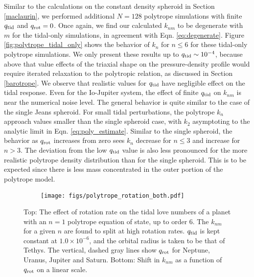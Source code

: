 Similar to the calculations on the constant density spheroid in Section \ref{maclaurin}, we
performed additional $N=128$ polytrope simulations with finite $q_{\rm tid}$ and
$q_{\rm rot}=0$. Once again, we find our calculated $k_{nm}$ to be degenerate with
$m$ for the tidal-only simulations, in agreement with Eqn. \eqref{eq:degenerate}.
Figure \ref{fig:polytrope_tidal_only} shows the behavior of $k_n$ for $n\leq6$ for
these tidal-only polytrope simulations.  We only present these results up to $q_{\rm
tid}\sim10^{-4}$, because above that value effects of the triaxial shape on the
pressure-density profile would require iterated relaxation to the polytropic
relation, as discussed in Section \ref{barotrope}. We observe that realistic values
for $q_{\rm tid}$ have negligible effect on the tidal response. Even for the
Io-Jupiter system, the effect of finite $q_{\rm tid}$ on $k_{nm}$ is near the
numerical noise level. The general behavior is quite similar to the case of the
single Jeans spheroid.  For small tidal perturbations, the polytrope $k_n$
approach values smaller than the single spheroid case, with $k_2$ asymptoting to
the analytic limit in Eqn.  \eqref{eq:poly_estimate}.  Similar to the single  
spheroid, the behavior as $q_{\rm rot}$ increases from zero sees $k_n$ decrease for
$n\leq3$ and increase for $n>3$.  The deviation from the low $q_{\rm tid}$ value is
also less pronounced for the more realistic polytrope density distribution than for
the single spheroid. This is to be expected since there is less mass concentrated
in the outer portion of the polytrope model. 


\begin{figure}[h]  
  \centering
    \texttt{[image: figs/polytrope\_rotation\_both.pdf]}
\caption{ Top: The effect of rotation rate on the tidal love numbers of a planet with an
    $n=1$ polytrope equation of state, up to order 6. The $k_{nm}$ for a given $n$
    are found to split at high rotation rates. $q_{\rm tid}$ is kept constant at
    $1.0\times10^{-6}$, and the orbital radius is taken to be that of Tethys. The
    vertical, dashed gray lines show $q_{\rm rot}$ for Neptune, Uranus, Jupiter and Saturn.
    Bottom: Shift in $k_{nm}$ as a function of $q_{\rm rot}$ on a linear scale.}
\label{fig:polytrope_rotation_effect}
\end{figure}


